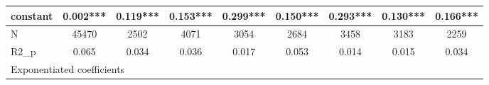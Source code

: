 {\begin{tabular}{l*{8}{c}}
constant    &       0.002***&       0.119***&       0.153***&       0.299***&       0.150***&       0.293***&       0.130***&       0.166***\\
\hline
N           &       45470   &        2502   &        4071   &        3054   &        2684   &        3458   &        3183   &        2259   \\
R2\_p        &       0.065   &       0.034   &       0.036   &       0.017   &       0.053   &       0.014   &       0.015   &       0.034   \\
\hline\hline
\multicolumn{9}{l}{\footnotesize Exponentiated coefficients}\\
\end{tabular}
}
